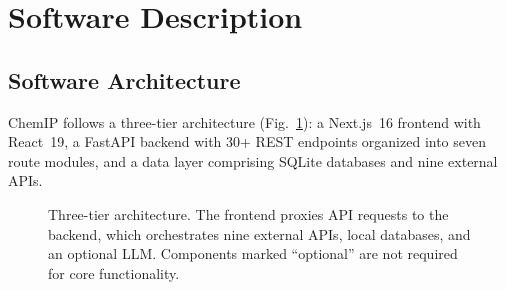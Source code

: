 \documentclass[preprint,12pt]{elsarticle}
\begin{document}
\section{Software Description}
\label{sec:software}

\subsection{Software Architecture}
\label{sec:architecture}

ChemIP follows a three-tier architecture (Fig.~\ref{fig:architecture}): a Next.js~16 frontend with React~19, a FastAPI backend with 30+ REST endpoints organized into seven route modules, and a data layer comprising SQLite databases and nine external APIs.

\begin{figure}[H]
\centering
{}
\caption{Three-tier architecture. The frontend proxies API requests to the backend, which orchestrates nine external APIs, local databases, and an optional LLM. Components marked ``optional'' are not required for core functionality.}
\label{fig:architecture}
\end{figure}
\end{document}
